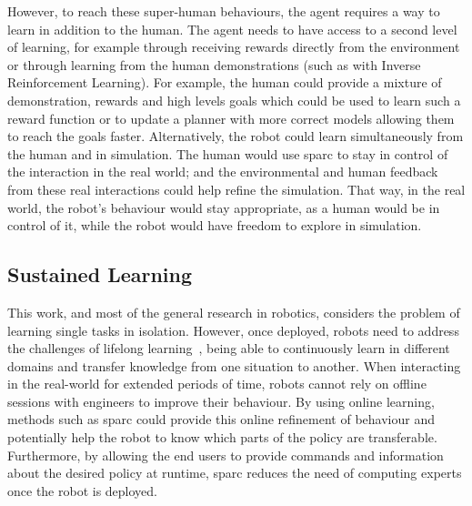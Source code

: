 However, to reach these super-human behaviours, the agent requires a way to learn in addition to the human. The agent needs to have access to a second level of learning, for example through receiving rewards directly from the environment or through learning from the human demonstrations (such as with Inverse Reinforcement Learning). For example, the human could provide a mixture of demonstration, rewards and high levels goals which could be used to learn such a reward function or to update a planner with more correct models allowing them to reach the goals faster. Alternatively, the robot could learn simultaneously from the human and in simulation. The human would use \gls{sparc} to stay in control of the interaction in the real world; and the environmental and human feedback from these real interactions could help refine the simulation. That way, in the real world, the robot's behaviour would stay appropriate, as a human would be in control of it, while the robot would have freedom to explore in simulation.

\subsection{Sustained Learning}

This work, and most of the general research in robotics, considers the problem of learning single tasks in isolation. However, once deployed, robots need to address the challenges of lifelong learning~\citep{thrun1995lifelong}, being able to continuously learn in different domains and transfer knowledge from one situation to another. When interacting in the real-world for extended periods of time, robots cannot rely on offline sessions with engineers to improve their behaviour. By using online learning, methods such as \gls{sparc} could provide this online refinement of behaviour and potentially help the robot to know which parts of the policy are transferable. Furthermore, by allowing the end users to provide commands and information about the desired policy at runtime, \gls{sparc} reduces the need of computing experts once the robot is deployed. %

